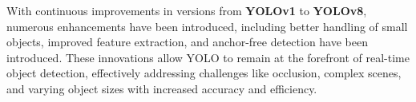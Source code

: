 %
With continuous improvements in versions from \textbf{YOLOv1} to \textbf{YOLOv8}, numerous enhancements have been introduced, including better handling of small objects, improved feature extraction, and anchor-free detection have been introduced. 
%
These innovations allow YOLO to remain at the forefront of real-time object detection, effectively addressing challenges like occlusion, complex scenes, and varying object sizes with increased accuracy and efficiency.
%
%
%
